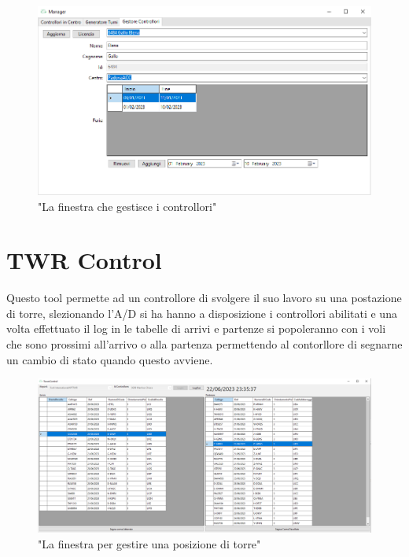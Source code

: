 \begin{figure}[H]
     \centering
     \includegraphics[width=1\textwidth]{figures/CM.PNG}
     \caption{"La finestra che gestisce i controllori"}
   \end{figure}
\section{TWR Control}
Questo tool permette ad un controllore di svolgere il suo lavoro su una postazione di torre,
 slezionando l'A/D si ha hanno a disposizione i controllori abilitati e una volta effettuato il log in le tabelle di arrivi e partenze si popoleranno con i voli che sono prossimi all'arrivo o alla partenza permettendo al contorllore di segnarne un cambio di stato quando questo avviene.
 \begin{figure}[H]
     \centering
     \includegraphics[width=1\textwidth]{figures/twr.PNG}
     \caption{"La finestra per gestire una posizione di torre"}
   \end{figure}
